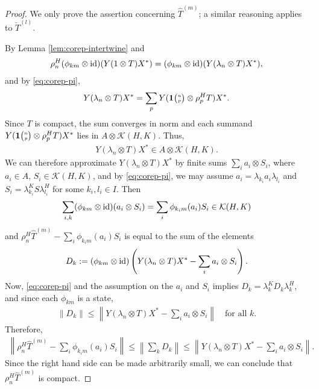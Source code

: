 \begin{proof}
  We only prove the assertion concerning $\hat T^{(m)}$; a similar reasoning applies to $\check
  T^{(l)}$.

By Lemma \ref{lem:corep-intertwine} and
  \begin{align*}
    \rho^{H}_{n}(\phi_{km} \otimes \operatorname{id})(Y(1\otimes T)X^{*}) = 
    (\phi_{km} \otimes \operatorname{id})(Y(\lambda_{n} \otimes T)X^{*}),
  \end{align*}
and  by \eqref{eq:corep-pi}, 
\begin{align*}
    Y(\lambda_{n} \otimes T)X^{*} =  \sum_{p} Y(\mathbf{1}{\tiny {\begin{pmatrix} n\\p\end{pmatrix}}} \otimes \rho^{H}_{p}T)X^{*}.
  \end{align*}
  Since $T$ is compact, the sum converges in norm and each summand $Y(\mathbf{1}{\tiny {\begin{pmatrix} n\\p\end{pmatrix}}} \otimes
  \rho^{H}_{p}T)X^{*}$ lies in $A \otimes \mathcal{K}(H,K)$. Thus,
  \begin{align*}
    Y(\lambda_{n} \otimes T)X^{*} \in A \otimes \mathcal{K}(H,K).
  \end{align*}
 We can therefore approximate $Y(\lambda_{n}
  \otimes T)X^{*}$ by finite sums $\sum_{i} a_{i} \otimes S_{i}$,
  where $a_{i} \in A$, $S_{i} \in \mathcal{K}(H,K)$, and by
  \eqref{eq:corep-pi}, we may assume $a_{i}=\lambda_{k_{i}}a_{i}
  \lambda_{l_{i}}$ and $S_{i}=\lambda_{k_{i}}^{K}S\lambda_{l_{i}}^{H}$
  for some $k_{i},l_{i}\in I$. Then
  \begin{align*}
\sum_{i,k}    (\phi_{km} \otimes \operatorname{id})(a_{i} \otimes S_{i}) = \sum_{i}
\phi_{k_{i}m}(a_{i})S_{i} \in \mathcal{K}(H,K)
  \end{align*}
and  $  \rho^{H}_{n}\hat T^{(m)} - \sum_{i}
\phi_{k_{i}m}(a_{i})S_{i}$ is equal to the sum of the elements
\begin{align*}
  D_{k}:=   (\phi_{km} \otimes \operatorname{id})\left(Y(\lambda_{n} \otimes T)X^{*} -
    \sum_{i}a_{i} \otimes S_{i}\right).
\end{align*}
Now, \eqref{eq:corep-pi} and the assumption on the $a_{i}$ and $S_{i}$ %
implies $D_{k} = \lambda_{k}^{K}D_{k}\lambda_{k}^{H}$, and  since each $\phi_{km}$ is a state,
\begin{align*}
  \|D_{k}\| \leq \left\|Y(\lambda_{n} \otimes T)X^{*} -
    \sum_{i}a_{i} \otimes S_{i}\right\| \quad\text{for all } k.
\end{align*}
Therefore, 
\begin{align*}
\left\|    \rho^{H}_{n}\hat T^{(m)} - \sum_{i}
\phi_{k_{i}m}(a_{i})S_{i}\right\| \leq \left\|\sum_{k} D_{k}\right\| \leq \left\|Y(\lambda_{n} \otimes T)X^{*} -
    \sum_{i}a_{i} \otimes S_{i}\right\|.
\end{align*}
Since the right hand side can be made arbitrarily small, we can
conclude that $\rho^{H}_{n}\hat T^{(m)}$ is compact. 
\end{proof}
